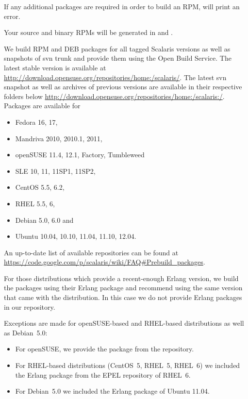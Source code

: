 If any additional packages are required in order to build an RPM,
 will print an error.

Your source and binary RPMs will be generated in
 and .

We build RPM and DEB packages for all tagged Scalaris versions as well as
snapshots of svn trunk and provide them using the Open Build Service.
The latest stable version is available at
\url{http://download.opensuse.org/repositories/home:/scalaris/}.
The latest svn snapshot as well as archives of previous versions are available
in their respective folders below
\url{http://download.opensuse.org/repositories/home:/scalaris:/}. Packages
are available for

\begin{itemize}
\item Fedora 16, 17,
\item Mandriva 2010, 2010.1, 2011,
\item openSUSE 11.4, 12.1, Factory, Tumbleweed
\item SLE 10, 11, 11SP1, 11SP2,
\item CentOS 5.5, 6.2,
\item RHEL 5.5, 6,
\item Debian 5.0, 6.0 and
\item Ubuntu 10.04, 10.10, 11.04, 11.10, 12.04.
\end{itemize}

An up-to-date list of available repositories can be found at
\url{https://code.google.com/p/scalaris/wiki/FAQ#Prebuild_packages}.

For those distributions which provide a recent-enough Erlang version, we build
the packages using their Erlang package and recommend using the same version
that came with the distribution. In this case we do not provide Erlang packages
in our repository.

Exceptions are made for openSUSE-based and RHEL-based distributions as well as
Debian~5.0:
\begin{itemize}
  \item For openSUSE, we provide the package from the 
repository.
  \item For RHEL-based distributions (CentOS~5, RHEL~5, RHEL~6) we included the Erlang
package from the EPEL repository of RHEL~6.
  \item For Debian~5.0 we included the Erlang package of Ubuntu 11.04.
\end{itemize}
